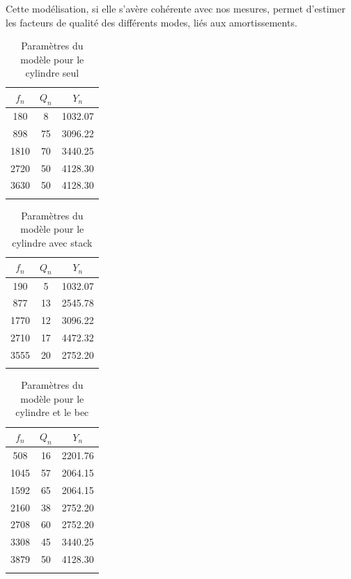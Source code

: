 \documentclass[atiam, article]{rapport} %
\begin{document}
Cette modélisation, si elle s'avère cohérente avec nos mesures, permet d'estimer les facteurs de qualité des différents modes, liés aux amortissements.

\begin{table}[H]
    \centering
    \begin{tabular}{ccc}
\toprule
$f_n$ & $Q_n$ & $Y_n$ \\ \midrule
180 & 8 & 1032.07 \\
898 & 75 & 3096.22 \\
1810 & 70 & 3440.25 \\
2720 & 50 & 4128.30 \\
3630 & 50 & 4128.30 \\
\bottomrule\\
    \end{tabular}
    \caption{Paramètres du modèle pour le cylindre seul}
    \label{tab:param_cylindre}
\end{table}

\begin{table}[H]
    \centering
    \begin{tabular}{ccc}
\toprule
$f_n$ & $Q_n$ & $Y_n$ \\ \midrule
190 & 5 & 1032.07 \\
877 & 13 & 2545.78 \\
1770 & 12 & 3096.22 \\
2710 & 17 & 4472.32 \\
3555 & 20 & 2752.20 \\
\bottomrule\\
    \end{tabular}
    \caption{Paramètres du modèle pour le cylindre avec stack}
    \label{tab:param_cylindre+stack}
\end{table}

\begin{table}[H]
    \centering
    \begin{tabular}{ccc}
\toprule
$f_n$ & $Q_n$ & $Y_n$ \\ \midrule
508 & 16 & 2201.76 \\
1045 & 57 & 2064.15 \\
1592 & 65 & 2064.15 \\
2160 & 38 & 2752.20 \\
2708 & 60 & 2752.20 \\
3308 & 45 & 3440.25 \\
3879 & 50 & 4128.30 \\
\bottomrule\\
    \end{tabular}
    \caption{Paramètres du modèle pour le cylindre et le bec}
    \label{tab:param_cylindre+bec}
\end{table}
\end{document}

